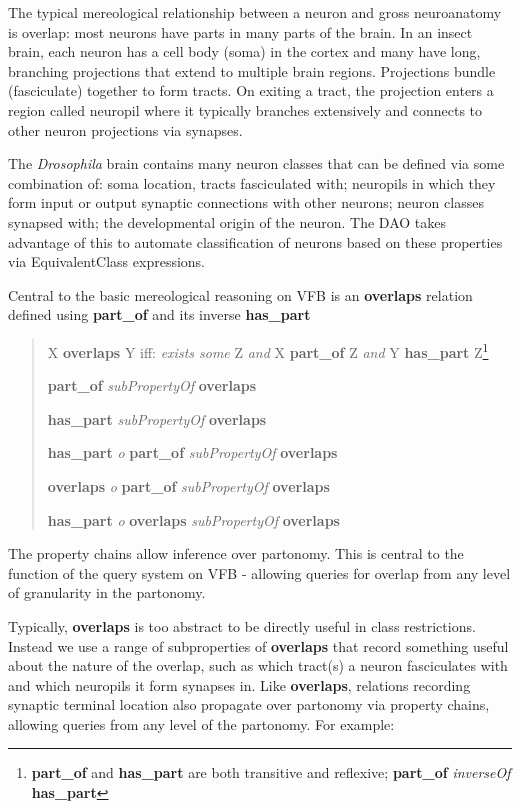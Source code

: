 \documentclass[runningheads,a4paper]{llncs}
\begin{document}
The typical mereological relationship between a neuron and gross
neuroanatomy is overlap:  most neurons have parts in many
parts of the brain.  In an insect brain, each neuron has a cell body
(soma) in the cortex and many have long, branching projections that extend
to multiple brain regions.  Projections bundle (fasciculate)
together to form tracts.  On exiting a tract, the projection enters a
region called neuropil where it typically branches extensively and
connects to other neuron projections via synapses.

The \textit{Drosophila} brain contains many neuron classes that can be
defined via some combination of: soma location, tracts fasciculated
with; neuropils in which they form input or output synaptic
connections with other neurons; neuron classes synapsed with; the
developmental origin of the neuron.  The DAO takes advantage of this
to automate classification of neurons based on these properties via
EquivalentClass expressions.

Central to the basic mereological reasoning on VFB is an
\textbf{overlaps} relation defined using \textbf{part\_of} and its
inverse \textbf{has\_part}

\begin{quote}
X \textbf{overlaps} Y iff: \textit{exists some} Z \textit{and}
X \textbf{part\_of} Z \textit{and} Y \textbf{has\_part}
Z\footnote{\textbf{part\_of} and \textbf{has\_part} are both
  transitive and reflexive; \textbf{part\_of} \textit{inverseOf}
  \textbf{has\_part}}

\textbf{part\_of} \textit{subPropertyOf}
  \textbf{overlaps}

\textbf{has\_part} \textit{subPropertyOf} \textbf{overlaps}

\textbf{has\_part} \textit{o} \textbf{part\_of} \textit{subPropertyOf}
\textbf{overlaps}

\textbf{overlaps} \textit{o} \textbf{part\_of} \textit{subPropertyOf} \textbf{overlaps}

\textbf{has\_part} \textit{o} \textbf{overlaps} \textit{subPropertyOf}
\textbf{overlaps}\end{quote}

The property chains allow inference over partonomy.  This is central
to the function of the query system on VFB - allowing queries for
overlap from any level of granularity in the partonomy.

Typically, \textbf{overlaps} is too abstract to be directly useful in
class restrictions. Instead we use a range of subproperties of
\textbf{overlaps} that record something useful about the nature of the
overlap, such as which tract(s) a neuron fasciculates with and which
neuropils it form synapses in.  Like \textbf{overlaps}, relations
recording synaptic terminal location also propagate over partonomy via
property chains, allowing queries from any level of the partonomy.
For example:
\end{document}
